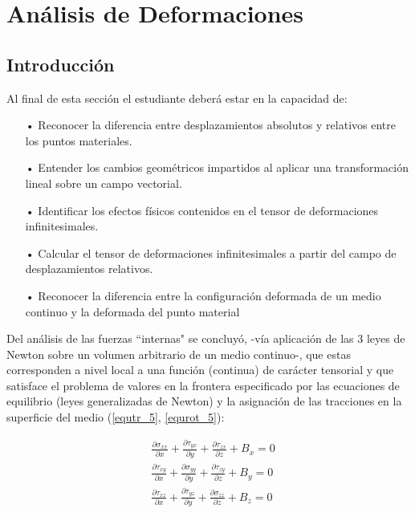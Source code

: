 \documentclass[../notas medios.tex]{subfiles}
\begin{document}
\chapter{Análisis de Deformaciones}

\graphicspath{{img/Cap5/}} 								 %
\section{Introducción}

Al final de esta sección el estudiante deberá estar en la capacidad de:

\begin{itemize}
\item[•] Reconocer la diferencia entre desplazamientos absolutos y relativos entre los puntos materiales.
\item[•] Entender los cambios geométricos impartidos al aplicar una transformación lineal sobre un campo vectorial.
\item[•] Identificar los efectos físicos contenidos en el tensor de deformaciones infinitesimales.
\item[•] Calcular el tensor de deformaciones infinitesimales a partir del campo de desplazamientos relativos. 
\item[•] Reconocer la diferencia entre la configuración deformada de un medio continuo y la deformada del punto material
\end{itemize}

Del análisis de las fuerzas ``internas" se concluyó, -vía aplicación de las 3 leyes de Newton sobre un volumen arbitrario de un medio continuo-, que estas corresponden a nivel local a una función (continua) de carácter tensorial y que satisface el problema de valores en la frontera especificado por las ecuaciones de equilibrio (leyes generalizadas de Newton) y la asignación de las tracciones en la superficie del medio (\cref{equtr_5}, \cref{equrot_5}):

\begin{equation} \label{equtr_5}
\begin{split}
& \frac{{\partial {\sigma _{xx}}}}{{\partial x}} + \frac{{\partial {\tau _{yx}}}}{{\partial y}} + \frac{{\partial {\tau _{zx}}}}{{\partial z}} + {B_x} = 0 \\
& \frac{{\partial {\tau _{xy}}}}{{\partial x}} + \frac{{\partial {\sigma _{yy}}}}{{\partial y}} + \frac{{\partial {\tau _{zy}}}}{{\partial z}} + {B_y} = 0 \\
& \frac{{\partial {\tau _{xz}}}}{{\partial x}} + \frac{{\partial {\tau _{yz}}}}{{\partial y}} + \frac{{\partial {\sigma _{zz}}}}{{\partial z}} + {B_z} = 0 
\end{split}
\end{equation}
\end{document}
